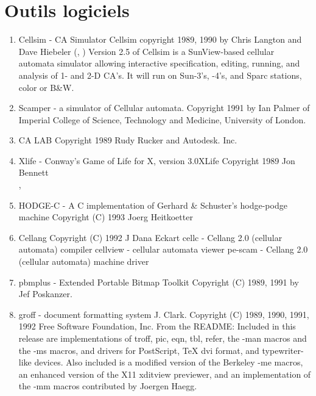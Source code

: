 \chapter{Outils logiciels}

%
\begin{enumerate}

\item{Cellsim}\label{soft-cellsim}
  - CA Simulator\hfil\break
  Cellsim copyright 1989, 1990 by Chris Langton and Dave Hiebeler
  (, )\hfil\break
  Version 2.5 of Cellsim is a SunView-based cellular automata simulator
  allowing interactive specification, editing, running, and analysis of
  1- and 2-D CA's.  It will run on Sun-3's, -4's, and Sparc stations,
  color or B\&W.

\item{Scamper}\label{soft-scamper}
  - a simulator of Cellular automata.\hfil\break
  Copyright 1991 by Ian Palmer of Imperial College of Science, Technology
  and Medicine, University of London.

\item{CA LAB}\label{soft-ca_lab}
  \hfil\break
  Copyright 1989 Rudy Rucker and Autodesk. Inc.

\item{Xlife}\label{soft-xlife}
  - Conway's Game of Life for X, version 3.0\hfil\break XLife
  Copyright 1989 Jon Bennett \\
  , 

\item{HODGE-C}\label{soft-hodge_c}
  - A C implementation of Gerhard \& Schuster's hodge-podge machine\hfil\break
  Copyright (C) 1993 Joerg Heitkoetter

\item{Cellang}\label{soft-cellang}
  \hfil\break
  Copyright (C) 1992  J Dana Eckart\hfil\break
  cellc - Cellang 2.0 (cellular automata) compiler\hfil\break
  cellview - cellular automata viewer\hfil\break
  pe-scam - Cellang 2.0 (cellular automata) machine driver

\item{pbmplus}\label{soft-pbm}
  - Extended Portable Bitmap Toolkit\hfil\break
  Copyright (C) 1989, 1991 by Jef Poskanzer.

\item{groff}\label{soft-groff}
  - document formatting system\hfil\break
  J. Clark. Copyright (C) 1989, 1990, 1991, 1992 Free Software Foundation,
  Inc.\hfil\break
  From the README:\hfil\break
  Included in this release are implementations of troff, pic, eqn,
  tbl, refer, the -man macros and the -ms macros, and drivers for
  PostScript, TeX dvi format, and typewriter-like devices.  Also
  included is a modified version of the Berkeley -me macros, an
  enhanced version of the X11 xditview previewer, and an
  implementation of the -mm macros contributed by Joergen Haegg.


\end{enumerate}
